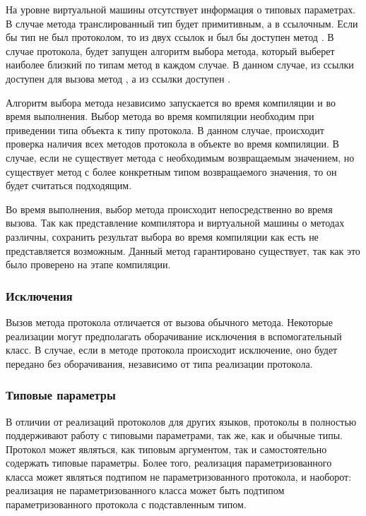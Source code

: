На уровне виртуальной машины отсутствует информация о типовых параметрах. В случае метода  транслированный тип будет примитивным, а в  ссылочным. Если бы тип  не был протоколом, то из двух ссылок  и  был бы доступен метод . В случае протокола, будет запущен алгоритм выбора метода, который выберет наиболее близкий по типам метод в каждом случае. В данном случае, из ссылки  доступен для вызова метод , а из ссылки  доступен .

Алгоритм выбора метода независимо запускается во время компиляции и во время выполнения. Выбор метода во время компиляции необходим при приведении типа объекта к типу протокола. В данном случае, происходит проверка наличия всех методов протокола в объекте во время компиляции. В случае, если не существует метода с необходимым возвращаемым значением, но существует метод с более конкретным типом возвращаемого значения, то он будет считаться подходящим.

Во время выполнения, выбор метода происходит непосредственно во время вызова. Так как представление компилятора и виртуальной машины о методах различны, сохранить результат выбора во время компиляции как есть не представляется возможным. Данный метод гарантировано существует, так как это было проверено на этапе компиляции.

\subsubsection{Исключения}
Вызов метода протокола отличается от вызова обычного метода. Некоторые реализации могут предполагать оборачивание исключения в вспомогательный класс. В случае, если в методе протокола происходит исключение, оно будет передано без оборачивания, независимо от типа реализации протокола.

\subsubsection{Типовые параметры}
В отличии от реализаций протоколов для других  языков, протоколы в  полностью поддерживают работу с типовыми параметрами, так же, как и обычные типы. Протокол может являться, как типовым аргументом, так и самостоятельно содержать типовые параметры. Более того, реализация параметризованного класса может являться подтипом не параметризованного протокола, и наоборот: реализация не параметризованного класса может быть подтипом параметризованного протокола с подставленным типом.

